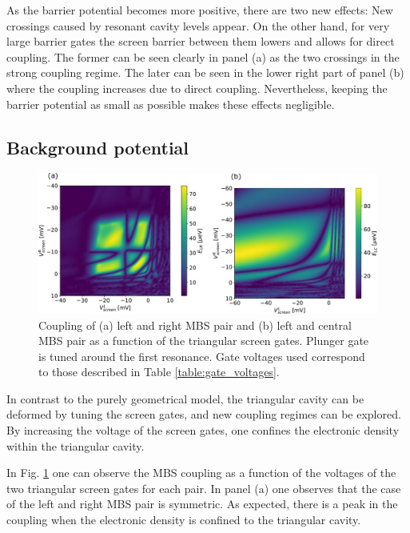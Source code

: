As the barrier potential becomes more positive, there are two new effects:
New crossings caused by resonant cavity levels appear.
On the other hand, for very large barrier gates the screen barrier between them lowers and allows for direct coupling.
The former can be seen clearly in panel (a) as the two crossings in the strong coupling regime.
The later can be seen in the lower right part of panel (b) where the coupling increases due to direct coupling.
Nevertheless, keeping the barrier potential as small as possible makes these effects negligible.

\subsection{Background potential}

\begin{figure}[h!]
\centering
  \includegraphics[width=\linewidth]{figures/device_1_screens.pdf}
  \caption{Coupling of (a) left and right MBS pair and (b) left and central MBS pair as a function of the triangular screen gates. Plunger gate is tuned around the first resonance. Gate voltages used correspond to those described in Table \ref{table:gate_voltages}.}
  \label{fig:device_1_screens}
\end{figure}

In contrast to the purely geometrical model, the triangular cavity can be deformed by tuning the screen gates, and new coupling regimes can be explored.
By increasing the voltage of the screen gates, one confines the electronic density within the triangular cavity.

In Fig. \ref{fig:device_1_screens} one can observe the MBS coupling as a function of the voltages of the two triangular screen gates for each pair.
In panel (a) one observes that the case of the left and right MBS pair is symmetric.
As expected, there is a peak in the coupling when the electronic density is confined to the triangular cavity.


